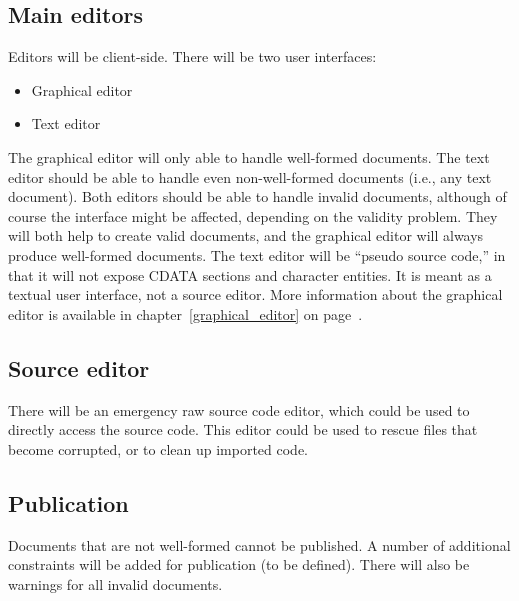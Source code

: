 \subsection{Main editors}
Editors will be client-side. There will be two user interfaces:
\begin{itemize}
\item Graphical editor
\item Text editor
\end{itemize}
The graphical editor will only able to handle well-formed documents. The text editor should be able to handle even non-well-formed documents (i.e., any text document). Both editors should be able to handle invalid documents, although of course the interface might be affected, depending on the validity problem. They will both help to create valid documents, and the graphical editor will always produce well-formed documents.
The text editor will be ``pseudo source code,'' in that it will not expose CDATA sections and character entities. It is meant as a textual user interface, not a source editor.
More information about the graphical editor is available in chapter~\ref{graphical_editor} on page~\pageref{graphical_editor}.
\subsection{Source editor}
There will be an emergency raw source code editor, which could be used to directly access the source code. This editor could be used to rescue files that become corrupted, or to clean up imported code.
\subsection{Publication}
Documents that are not well-formed cannot be published. A number of additional constraints will be added for publication (to be defined). There will also be warnings for all invalid documents.

